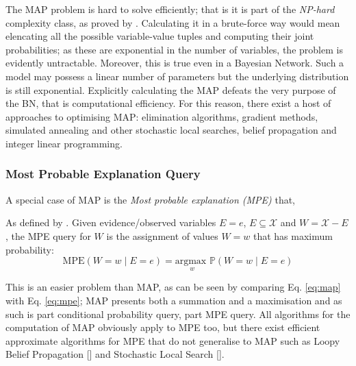 The MAP problem is hard to solve efficiently; that is it is part of the \textit{NP-hard} complexity class, as proved by \cite{Shimony1994}.
Calculating it in a brute-force way would mean elencating all the possible variable-value tuples and computing their joint probabilities; as these are exponential in the number of variables, the problem is evidently untractable.
Moreover, this is true even in a Bayesian Network.  
Such a model may possess a linear number of parameters but the underlying distribution is still exponential.
Explicitly calculating the MAP defeats the very purpose of the BN, that is computational efficiency.
For this reason, there exist a host of approaches to optimising MAP: elimination algorithms, gradient methods, simulated annealing and other stochastic local searches, belief propagation and integer linear programming.


\subsubsection{Most Probable Explanation Query}
A special case of MAP is the \textit{Most probable explanation (MPE)} that, 
\begin{definition}
	As defined by \cite{koller2007introduction}.
 Given evidence/observed variables $E=e$, $E \subseteq \mathcal{X}$ and $W = \mathcal{X} - E$, the MPE query for $W$ is the assignment of values $W=w$ that has maximum probability:
	\begin{equation} \label{eq:mpe}
	\text{MPE}( W=w \mid E=e ) = \underset{w}{\text{argmax }} \mathbb{P}(W=w \mid E=e)
\end{equation}
\end{definition}

This is an easier problem than MAP, as can be seen by comparing Eq. \ref{eq:map} with Eq. \ref{eq:mpe}; MAP presents both a summation and a maximisation and as such is part conditional probability query, part MPE query.
All algorithms for the computation of MAP obviously apply to MPE too, but there exist efficient approximate algorithms for MPE that do not generalise to MAP such as Loopy Belief Propagation [\cite{Pearl1988}] and Stochastic Local Search [\cite{Kask1999}].
